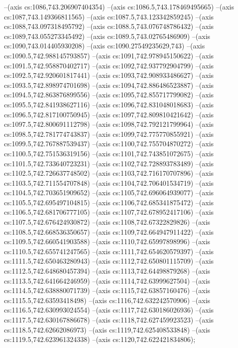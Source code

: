 --(axis cs:1086,743.206907404354)
--(axis cs:1086.5,743.178469495665)
--(axis cs:1087,743.149366811565)
--(axis cs:1087.5,743.123342859245)
--(axis cs:1088,743.097318495792)
--(axis cs:1088.5,743.076748786432)
--(axis cs:1089,743.055273345492)
--(axis cs:1089.5,743.02765486909)
--(axis cs:1090,743.014405930208)
--(axis cs:1090.27549235629,743)
--(axis cs:1090.5,742.988145793857)
--(axis cs:1091,742.978945150622)
--(axis cs:1091.5,742.958870402717)
--(axis cs:1092,742.937792904799)
--(axis cs:1092.5,742.920601817441)
--(axis cs:1093,742.908933486627)
--(axis cs:1093.5,742.898974701698)
--(axis cs:1094,742.886486523887)
--(axis cs:1094.5,742.863876899556)
--(axis cs:1095,742.855717799082)
--(axis cs:1095.5,742.841938627116)
--(axis cs:1096,742.831048018683)
--(axis cs:1096.5,742.817100750945)
--(axis cs:1097,742.809810421642)
--(axis cs:1097.5,742.800691112798)
--(axis cs:1098,742.792121799964)
--(axis cs:1098.5,742.781774743837)
--(axis cs:1099,742.775770855921)
--(axis cs:1099.5,742.767887539437)
--(axis cs:1100,742.755704870272)
--(axis cs:1100.5,742.751536319156)
--(axis cs:1101,742.743851072675)
--(axis cs:1101.5,742.733640723231)
--(axis cs:1102,742.728893783489)
--(axis cs:1102.5,742.726637748502)
--(axis cs:1103,742.716170707896)
--(axis cs:1103.5,742.711554707848)
--(axis cs:1104,742.706401534719)
--(axis cs:1104.5,742.703651909652)
--(axis cs:1105,742.696064939077)
--(axis cs:1105.5,742.695497104815)
--(axis cs:1106,742.685341875472)
--(axis cs:1106.5,742.681706777105)
--(axis cs:1107,742.678952417106)
--(axis cs:1107.5,742.676424930872)
--(axis cs:1108,742.67322829826)
--(axis cs:1108.5,742.668536350657)
--(axis cs:1109,742.664947911422)
--(axis cs:1109.5,742.660541903588)
--(axis cs:1110,742.65997898996)
--(axis cs:1110.5,742.655741247565)
--(axis cs:1111,742.654620579397)
--(axis cs:1111.5,742.650463280943)
--(axis cs:1112,742.650801115709)
--(axis cs:1112.5,742.648680457394)
--(axis cs:1113,742.64498879268)
--(axis cs:1113.5,742.641664246959)
--(axis cs:1114,742.63999627504)
--(axis cs:1114.5,742.638880071739)
--(axis cs:1115,742.63857160476)
--(axis cs:1115.5,742.63593418498)
--(axis cs:1116,742.632242570906)
--(axis cs:1116.5,742.630993024554)
--(axis cs:1117,742.630186026936)
--(axis cs:1117.5,742.630167886678)
--(axis cs:1118,742.627459923523)
--(axis cs:1118.5,742.62662086973)
--(axis cs:1119,742.625408533848)
--(axis cs:1119.5,742.623961324338)
--(axis cs:1120,742.622421834806);

